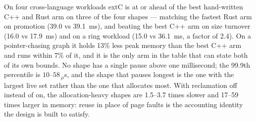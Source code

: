 On four cross-language workloads extC is at or ahead of the best hand-written C++ and Rust arm on three of the four shapes --- matching the fastest Rust arm on promotion (39.0 vs 39.1~ms), and beating the best C++ arm on size turnover (16.0 vs 17.9~ms) and on a ring workload (15.0 vs 36.1~ms, a factor of 2.4).
On a pointer-chasing graph it holds 13\% less peak memory than the best C++ arm and runs within 7\% of it, and it is the only arm in the table that can state both of its own bounds.
No shape has a single pause above one millisecond; the 99.9th percentile is $10$--$58\,_\mu$s, and the shape that pauses longest is the one with the largest live set rather than the one that allocates most.
With reclamation off instead of on, the allocation-heavy shapes are 1.5--3.7 times slower and 17--59 times larger in memory: reuse in place of page faults is the accounting identity the design is built to satisfy.
